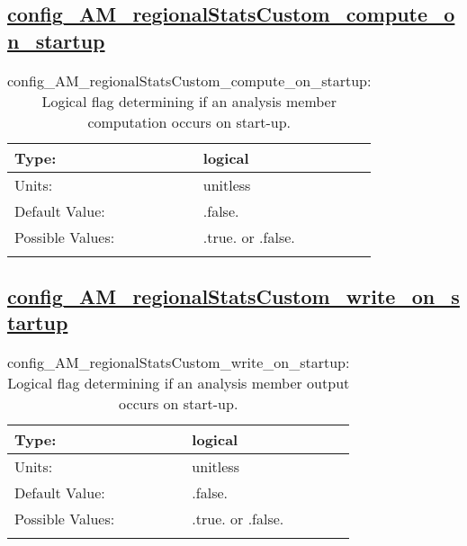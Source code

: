 \subsection[config\_AM\_regionalStatsCustom\_compute\_on\_startup]{\hyperref[sec:nm_tab_AM_regionalStatsCustom]{config\_AM\_regionalStatsCustom\_compute\_on\_startup}}
\label{subsec:nm_sec_config_AM_regionalStatsCustom_compute_on_startup}
\begin{center}
\begin{longtable}{| p{2.0in} || p{4.0in} |}
    \hline
    Type: & logical \\
    \hline
    Units: & \si{unitless} \\
    \hline
    Default Value: & .false. \\
    \hline
    Possible Values: & .true. or .false. \\
    \hline
    \caption{config\_AM\_regionalStatsCustom\_compute\_on\_startup: Logical flag determining if an analysis member computation occurs on start-up.}
\end{longtable}
\end{center}
\subsection[config\_AM\_regionalStatsCustom\_write\_on\_startup]{\hyperref[sec:nm_tab_AM_regionalStatsCustom]{config\_AM\_regionalStatsCustom\_write\_on\_startup}}
\label{subsec:nm_sec_config_AM_regionalStatsCustom_write_on_startup}
\begin{center}
\begin{longtable}{| p{2.0in} || p{4.0in} |}
    \hline
    Type: & logical \\
    \hline
    Units: & \si{unitless} \\
    \hline
    Default Value: & .false. \\
    \hline
    Possible Values: & .true. or .false. \\
    \hline
    \caption{config\_AM\_regionalStatsCustom\_write\_on\_startup: Logical flag determining if an analysis member output occurs on start-up.}
\end{longtable}
\end{center}
